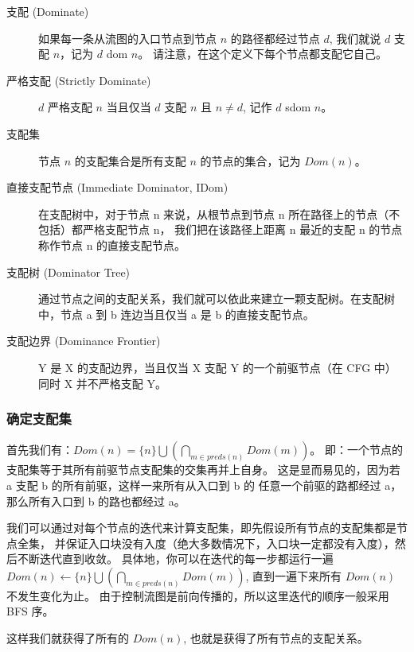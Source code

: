 \begin{description}
    \item[支配 (Dominate)]
    如果每一条从流图的入口节点到节点 $n$ 的路径都经过节点 $d$, 我们就说 $d$ 支配 $n$，记为 $d$ dom $n$。
    请注意，在这个定义下每个节点都支配它自己。

    \item[严格支配 (Strictly Dominate)]
    $d$ 严格支配 $n$ 当且仅当 $d$ 支配 $n$ 且 $n\neq d$, 记作 $d$ sdom $n$。

    \item[支配集]
    节点 $n$ 的支配集合是所有支配 $n$ 的节点的集合，记为 $\mathit{Dom}(n)$。

    \item[直接支配节点 (Immediate Dominator, IDom)]
    在支配树中，对于节点 n 来说，从根节点到节点 n 所在路径上的节点（不包括）都严格支配节点 n，
    我们把在该路径上距离 n 最近的支配 n 的节点称作节点 n 的直接支配节点。

    \item[支配树 (Dominator Tree)]
    通过节点之间的支配关系，我们就可以依此来建立一颗支配树。在支配树中，节点 a 到 b 连边当且仅当
    a 是 b 的直接支配节点。

    \item[支配边界 (Dominance Frontier)]
    Y 是 X 的支配边界，当且仅当 X 支配 Y 的一个前驱节点（在 CFG 中）
    同时 X 并不严格支配 Y。
\end{description}

\subsubsection{确定支配集}

首先我们有：$\mathit{Dom}(n) = \{n\} \bigcup \left(\bigcap_{m\in \mathit{preds}(n)} \mathit{Dom}(m)\right)$。
即：一个节点的支配集等于其所有前驱节点支配集的交集再并上自身。
这是显而易见的，因为若 a 支配 b 的所有前驱，这样一来所有从入口到 b 的
任意一个前驱的路都经过 a，那么所有入口到 b 的路也都经过 a。

我们可以通过对每个节点的迭代来计算支配集，即先假设所有节点的支配集都是节点全集，
并保证入口块没有入度（绝大多数情况下，入口块一定都没有入度），然后不断迭代直到收敛。
具体地，你可以在迭代的每一步都运行一遍 $\mathit{Dom}(n) \leftarrow \{n\} \bigcup
\left(\bigcap_{m\in \mathit{preds}(n)} \mathit{Dom}(m)\right)$,
直到一遍下来所有 $\mathit{Dom}(n)$ 不发生变化为止。
由于控制流图是前向传播的，所以这里迭代的顺序一般采用 BFS 序。

这样我们就获得了所有的 $\mathit{Dom}(n)$, 也就是获得了所有节点的支配关系。

